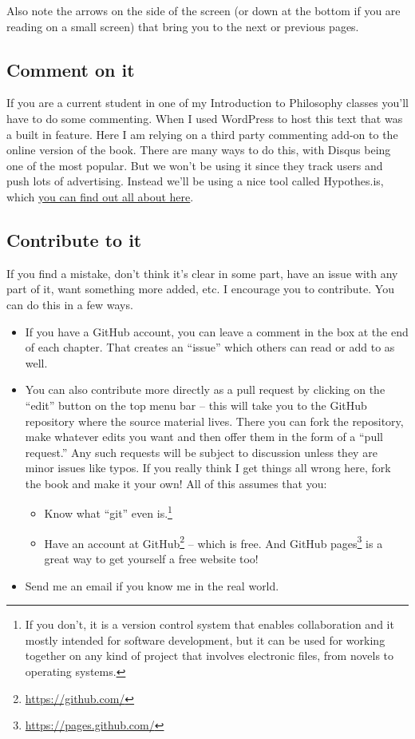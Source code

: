\documentclass[
  12pt, openany]{book}
\providecommand{\tightlist}{%
  \setlength{\itemsep}{0pt}\setlength{\parskip}{0pt}}
\renewcommand{\href}[2]{#2\footnote{\url{#1}}}
\begin{document}
Also note the arrows on the side of the screen (or down at the bottom if you are reading on a small screen) that bring you to the next or previous pages.

\hypertarget{comment-on-it}{%
\subsection*{Comment on it}\label{comment-on-it}}


If you are a current student in one of my Introduction to Philosophy classes you'll have to do some commenting. When I used WordPress to host this text that was a built in feature. Here I am relying on a third party commenting add-on to the online version of the book. There are many ways to do this, with Disqus being one of the most popular. But we won't be using it since they track users and push lots of advertising. Instead we'll be using a nice tool called Hypothes.is, which \protect\hyperlink{appendix-1}{you can find out all about here}.

\hypertarget{contribute}{%
\subsection*{Contribute to it}\label{contribute}}


If you find a mistake, don't think it's clear in some part, have an issue with any part of it, want something more added, etc. I encourage you to contribute. You can do this in a few ways.

\begin{itemize}
\tightlist
\item
  If you have a GitHub account, you can leave a comment in the box at the end of each chapter. That creates an ``issue'' which others can read or add to as well.
\item
  You can also contribute more directly as a pull request by clicking on the ``edit'' button on the top menu bar -- this will take you to the GitHub repository where the source material lives. There you can fork the repository, make whatever edits you want and then offer them in the form of a ``pull request.'' Any such requests will be subject to discussion unless they are minor issues like typos. If you really think I get things all wrong here, fork the book and make it your own! All of this assumes that you:

  \begin{itemize}
  \tightlist
  \item
    Know what ``git'' even is.\footnote{If you don't, it is a version control system that enables collaboration and it mostly intended for software development, but it can be used for working together on any kind of project that involves electronic files, from novels to operating systems.}
  \item
    Have an account at \href{https://github.com/}{GitHub} -- which is free. And \href{https://pages.github.com/}{GitHub pages} is a great way to get yourself a free website too!
  \end{itemize}
\item
  Send me an email if you know me in the real world.
\end{itemize}
\end{document}
